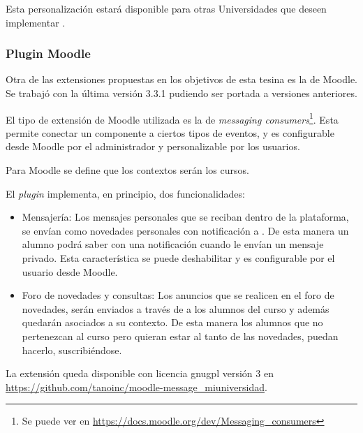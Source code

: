 Esta personalización estará disponible para otras Universidades que deseen implementar \nombreApp{}.

\subsubsection{Plugin Moodle}
\label{desarrollo_plugins_moodle}

Otra de las extensiones propuestas en los objetivos de esta tesina es la de Moodle. Se trabajó con la última versión 3.3.1 pudiendo ser portada a versiones anteriores.

El tipo de extensión de Moodle utilizada es la de \textit{messaging consumers}\footnote{Se puede ver en \url{https://docs.moodle.org/dev/Messaging_consumers}}. Esta permite conectar un componente a ciertos tipos de eventos, y es configurable desde Moodle por el administrador y personalizable por los usuarios.

Para Moodle se define que los contextos serán los cursos.

El \textit{plugin} implementa, en principio, dos funcionalidades:
\begin{itemize}
\item Mensajería: Los mensajes personales que se reciban dentro de la plataforma, se envían como novedades personales con notificación a \nombreApp{}. De esta manera un alumno podrá saber con una notificación cuando le envían un mensaje privado. Esta característica se puede deshabilitar y es configurable por el usuario desde Moodle.
\item Foro de novedades y consultas: Los anuncios que se realicen en el foro de novedades, serán enviados a través de \nombreApp{} a los alumnos del curso y además quedarán asociados a su contexto. De esta manera los alumnos que no pertenezcan al curso pero quieran estar al tanto de las novedades, puedan hacerlo, suscribiéndose.
\end{itemize}

La extensión queda disponible con licencia \gls{gnugpl} versión 3 en \url{https://github.com/tanoinc/moodle-message_miuniversidad}.